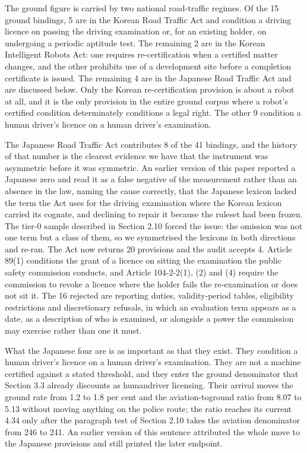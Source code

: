The ground figure is carried by two national road-traffic regimes. Of the 15 ground bindings, 5 are in the Korean Road Traffic Act and condition a driving licence on passing the driving examination or, for an existing holder, on undergoing a periodic aptitude test. The remaining 2 are in the Korean Intelligent Robots Act: one requires re-certification when a certified matter changes, and the other prohibits use of a development site before a completion certificate is issued. The remaining 4 are in the Japanese Road Traffic Act and are discussed below. Only the Korean re-certification provision is about a robot at all, and it is the only provision in the entire ground corpus where a robot's certified condition determinately conditions a legal right. The other 9 condition a human driver's licence on a human driver's examination.

The Japanese Road Traffic Act contributes 8 of the 41 bindings, and the history of that number is the clearest evidence we have that the instrument was asymmetric before it was symmetric. An earlier version of this paper reported a Japanese zero and read it as a false negative of the measurement rather than an absence in the law, naming the cause correctly, that the Japanese lexicon lacked the term the Act uses for the driving examination where the Korean lexicon carried its cognate, and declining to repair it because the ruleset had been frozen. The tier-0 sample described in Section 2.10 forced the issue: the omission was not one term but a class of them, so we symmetrised the lexicons in both directions and re-ran. The Act now returns 20 provisions and the audit accepts 4. Article 89(1) conditions the grant of a licence on sitting the examination the public safety commission conducts, and Article 104-2-2(1), (2) and (4) require the commission to revoke a licence where the holder fails the re-examination or does not sit it. The 16 rejected are reporting duties, validity-period tables, eligibility restrictions and discretionary refusals, in which an evaluation term appears as a date, as a description of who is examined, or alongside a power the commission may exercise rather than one it must.

What the Japanese four are is as important as that they exist. They condition a human driver's licence on a human driver's examination. They are not a machine certified against a stated threshold, and they enter the ground denominator that Section 3.3 already discounts as humandriver licensing. Their arrival moves the ground rate from 1.2 to 1.8 per cent and the aviation-toground ratio from 8.07 to 5.13 without moving anything on the police route; the ratio reaches its current 4.34 only after the paragraph test of Section 2.10 takes the aviation denominator from 246 to 241. An earlier version of this sentence attributed the whole move to the Japanese provisions and still printed the later endpoint.

